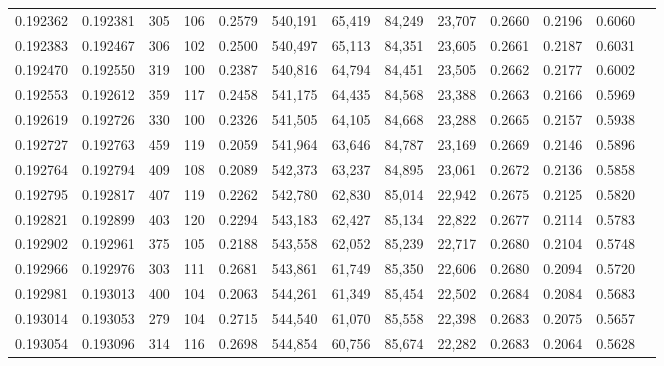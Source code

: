 \begin{tabular}{rrrrrrrrrrrrr}
0.192362 & 0.192381 &   305 & 106 &                                     0.2579 & 540,191 &  65,419 &  84,249 &  23,707 & 0.2660 & 0.2196 & 0.6060 \\
0.192383 & 0.192467 &   306 & 102 &                                     0.2500 & 540,497 &  65,113 &  84,351 &  23,605 & 0.2661 & 0.2187 & 0.6031 \\
0.192470 & 0.192550 &   319 & 100 &                                     0.2387 & 540,816 &  64,794 &  84,451 &  23,505 & 0.2662 & 0.2177 & 0.6002 \\
0.192553 & 0.192612 &   359 & 117 &                                     0.2458 & 541,175 &  64,435 &  84,568 &  23,388 & 0.2663 & 0.2166 & 0.5969 \\
0.192619 & 0.192726 &   330 & 100 &                                     0.2326 & 541,505 &  64,105 &  84,668 &  23,288 & 0.2665 & 0.2157 & 0.5938 \\
0.192727 & 0.192763 &   459 & 119 &                                     0.2059 & 541,964 &  63,646 &  84,787 &  23,169 & 0.2669 & 0.2146 & 0.5896 \\
0.192764 & 0.192794 &   409 & 108 &                                     0.2089 & 542,373 &  63,237 &  84,895 &  23,061 & 0.2672 & 0.2136 & 0.5858 \\
0.192795 & 0.192817 &   407 & 119 &                                     0.2262 & 542,780 &  62,830 &  85,014 &  22,942 & 0.2675 & 0.2125 & 0.5820 \\
0.192821 & 0.192899 &   403 & 120 &                                     0.2294 & 543,183 &  62,427 &  85,134 &  22,822 & 0.2677 & 0.2114 & 0.5783 \\
0.192902 & 0.192961 &   375 & 105 &                                     0.2188 & 543,558 &  62,052 &  85,239 &  22,717 & 0.2680 & 0.2104 & 0.5748 \\
0.192966 & 0.192976 &   303 & 111 &                                     0.2681 & 543,861 &  61,749 &  85,350 &  22,606 & 0.2680 & 0.2094 & 0.5720 \\
0.192981 & 0.193013 &   400 & 104 &                                     0.2063 & 544,261 &  61,349 &  85,454 &  22,502 & 0.2684 & 0.2084 & 0.5683 \\
0.193014 & 0.193053 &   279 & 104 &                                     0.2715 & 544,540 &  61,070 &  85,558 &  22,398 & 0.2683 & 0.2075 & 0.5657 \\
0.193054 & 0.193096 &   314 & 116 &                                     0.2698 & 544,854 &  60,756 &  85,674 &  22,282 & 0.2683 & 0.2064 & 0.5628 \\

\end{tabular}
